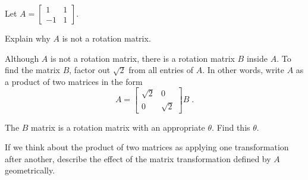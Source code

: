 \begin{activity} \label{act:4e_2} Let $A=\left[ \begin{array}{rc} 1&1 \\ -1&1 \end{array} \right]$. 

	\ba
	\item Explain why $A$ is not a rotation matrix.
	
	
	
	\item Although $A$ is not a rotation matrix, there is a rotation matrix $B$ inside $A$. To find the matrix $B$, factor out $\sqrt{2}$ from all entries of $A$. In other words, write $A$ as a product of two matrices in the form
\[ A = \left[ \begin{array}{cc} \sqrt{2} &0 \\ 0&\sqrt{2} \end{array} \right] B \;. \]
		
	
		
	\item The $B$ matrix is a rotation matrix with an appropriate $\theta$. Find this $\theta$.
	
	
	
	\item If we think about the product of two matrices as applying one transformation after another, describe the effect of the matrix transformation defined by $A$ geometrically. 

	 		
			
	\ea
\end{activity}



